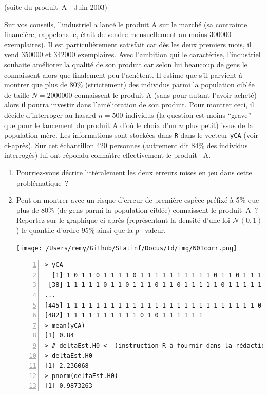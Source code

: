 \documentclass[10pt]{report}
\begin{document}
\begin{exercice} (suite du produit~A - Juin 2003)

Sur vos conseils, l'industriel a lanc{\'e} le produit A sur le march{\'e} (sa contrainte financi{\`e}re, rappelons-le, {\'e}tait de vendre mensuellement au moins 300000 exemplaires). Il est particuli{\`e}rement satisfait car d{\`e}s les deux premiers mois, il vend 350000 et 342000 exemplaires. Avec l'ambition qui le caract{\'e}rise, l'industriel souhaite am{\'e}liorer la qualit{\'e} de son produit car selon lui beaucoup de gens le connaissent alors que finalement peu l'ach{\`e}tent. Il estime que s'il parvient {\`a} montrer que plus de $80\%$ (strictement) des individus parmi la population cibl{\'e}e de taille $N=2000000$ connaissent le produit A (sans pour autant l'avoir achet{\'e}) alors il pourra investir dans l'am{\'e}lioration de son produit. Pour montrer ceci, il d{\'e}cide d'interroger au hasard $n=500$ individus (la question est moins ``grave'' que pour le lancement du produit A d'o{\`u} le choix d'un $n$ plus petit) issus de la population m{\`e}re. Les informations sont stock{\'e}es dans \texttt{R} dans le vecteur \texttt{yCA} (voir ci-apr{\`e}s). Sur cet {\'e}chantillon 420 personnes (autrement dit 84\% des individus interrog{\'e}s) lui ont r{\'e}pondu conna{\^\i}tre effectivement le produit~ A. \\
\begin{enumerate}
\item Pourriez-vous d{\'e}crire litt{\'e}ralement les deux erreurs mises en jeu dans cette probl{\'e}matique~? 



\item Peut-on montrer avec un risque d'erreur de premi{\`e}re esp{\`e}ce pr{\'e}fix{\'e} {\`a} 5\% que plus de 80\% (de gens parmi la population cibl{\'e}e) connaissent le produit~A~? Reportez sur le graphique ci-apr{\`e}s (repr{\'e}sentant la densit{\'e} d'une loi $\mathcal{N}(0,1)$) le quantile d'ordre 95\% ainsi que la p$-$valeur. 
 

\begin{center} 
\texttt{[image: /Users/remy/Github/Statinf/Docus/td/img/N01corr.png]}
\end{center}

\IndicR
\begin{Verbatim}[frame=leftline,fontfamily=tt,fontshape=n,numbers=left]
> yCA
  [1] 1 0 1 1 0 1 1 1 1 0 1 1 1 1 1 1 1 1 1 1 0 1 1 0 1 1 1 1 1 1 1 1 1 1 1 1 1
 [38] 1 1 1 1 1 0 1 1 0 1 1 1 0 1 1 0 1 1 1 1 1 0 1 1 1 1 1 0 1 1 1 1 1 1 1 1 1
...
[445] 1 1 1 1 1 1 1 1 1 1 1 1 1 1 1 1 1 1 1 1 1 1 1 1 1 1 0 0 1 0 1 1 1 1 1 1 1
[482] 1 1 1 1 1 1 1 1 1 1 0 1 0 1 1 1 1 1 1
> mean(yCA)
[1] 0.84
> # deltaEst.H0 <- (instruction R à fournir dans la rédaction)
> deltaEst.H0
[1] 2.236068
> pnorm(deltaEst.H0)
[1] 0.9873263
\end{Verbatim}




\end{enumerate}
\end{exercice}
\end{document}
